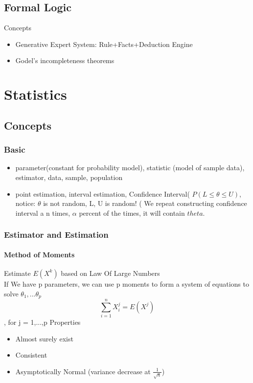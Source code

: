 \documentclass[11pt, openany]{book}              %
\begin{document}
\section{Formal Logic}

Concepts
\begin{itemize}
    \item Generative Expert System: Rule+Facts+Deduction Engine 
    \item Godel's incompleteness theorems
\end{itemize}

\chapter{Statistics}

\section{Concepts}
\subsection{Basic}
\begin{itemize}
    \item parameter(constant for probability model), statistic (model of sample data), estimator, data, sample, population
    \item point estimation, interval estimation, Confidence Interval( $P(L \leq \theta \leq U )$, notice: $\theta$ is not random, L, U is random! ( We repeat constructing confidence interval a n times, $\alpha$ percent of the times, it will contain $theta$.
\end{itemize}

\subsection{Estimator and Estimation}
\subsubsection{Method of Moments}
Estimate $E(X^k)$ based on Law Of Large Numbers\\ 
If We have p parameters, we can use p moments to form a system of equations to solve $\theta_1,...\theta_p$
    	$$\sum_{i=1}^n X_i^j= E(X^j)$$, for j = 1,...,p
 Properties 
    \begin{itemize}
    	\item Almost surely exist
    	\item Consistent
    	\item Asymptotically Normal (variance decrease at $\frac{1}{\sqrt{n}}$)
    \end{itemize}
\end{document}
